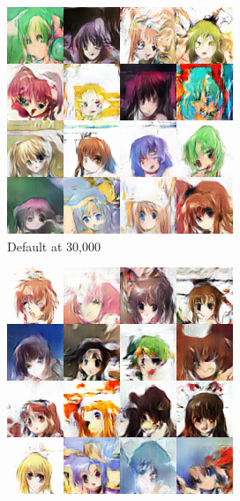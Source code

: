 \documentclass{article} %
\begin{document}
\begin{figure}[h!]
	\centering
	\begin{subfigure}[b]{0.24\linewidth}
		\includegraphics[width=\linewidth]{syed-default-30k.png}
		\caption{Default at 30,000}
		\label{fig:kerasLabelsDefault30k}
	\end{subfigure}
	\begin{subfigure}[b]{0.24\linewidth}
		\includegraphics[width=\linewidth]{syed-flipped-30k.png}

\end{subfigure}
\end{figure}
\end{document}
